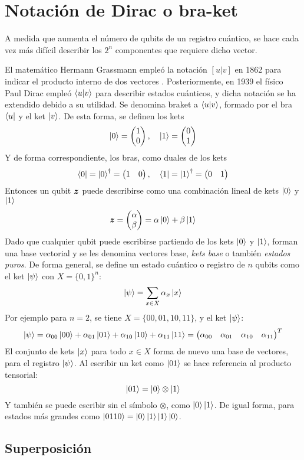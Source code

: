 \section{Notación de Dirac o bra-ket}
A medida que aumenta el número de qubits de un registro cuántico, se hace cada 
vez más difícil describir los $2^n$ componentes que requiere dicho vector.

El matemático Hermann Grassmann empleó la notación $[u|v]$ en 1862 para indicar 
el producto interno de dos vectores \cite{cajori-grassmann}. Posteriormente, en 
1939 el físico Paul Dirac empleó $\braket{u|v}$ para describir estados 
cuánticos, y dicha notación se ha extendido debido a su utilidad. Se denomina 
braket a $\braket{u|v}$, formado por el bra $\bra{u}$ y el ket $\ket{v}$.
%
De esta forma, se definen los kets
$$ \ket{0} = \begin{pmatrix} 1 \\ 0 \end{pmatrix}, \quad \ket{1} = \begin{pmatrix} 0 \\ 1 \end{pmatrix} $$
%
Y de forma correspondiente, los bras, como duales de los kets
$$ \bra{0} = \ket{0}^\dagger = \begin{pmatrix} 1 & 0 \end{pmatrix}, \quad
\bra 1 = \ket{1}^\dagger = \begin{pmatrix} 0 & 1 \end{pmatrix} $$
%
Entonces un qubit $\boldsymbol{z}$ puede describirse como una combinación lineal de kets 
$\ket{0}$ y $\ket{1}$
$$ \boldsymbol{z} = \begin{pmatrix} \alpha \\ \beta \end{pmatrix} = \alpha \ket{0} + \beta \ket{1}$$
Dado que cualquier qubit puede escribirse partiendo de los kets $\ket{0}$ y 
$\ket{1}$, forman una base vectorial y se les denomina vectores base, 
\textit{kets base} o también \textit{estados puros}.
%
De forma general, se define un estado cuántico o registro de $n$ qubits como el 
ket $\ket{\psi}$ con $X = \{0,1\}^n$:
$$ \ket{\psi} = \sum_{x \in X} \alpha_x \ket{x} $$
Por ejemplo para $n = 2$, se tiene $X = \{00, 01, 10, 11\}$, y el ket 
$\ket{\psi}$:
$$ \ket{\psi} = \alpha_{00} \ket{00} + \alpha_{01} \ket{01}
+ \alpha_{10} \ket{10} + \alpha_{11} \ket{11} =
\begin{pmatrix} \alpha_{00} & \alpha_{01} & \alpha_{10} & \alpha_{11} \end{pmatrix}^T $$
El conjunto de kets $\ket{x}$ para todo $x \in X$ forma de nuevo una base de 
vectores, para el registro $\ket{\psi}$. Al escribir un ket como $\ket{01}$ se 
hace referencia al producto tensorial:
$$ \ket{01} = \ket{0} \otimes \ket{1} $$
Y también se puede escribir sin el símbolo $\otimes$, como $\ket{0}\ket{1}$. De 
igual forma, para estados más grandes como $\ket{0110} = 
\ket{0}\ket{1}\ket{1}\ket{0}$.

\subsection{Superposición}

